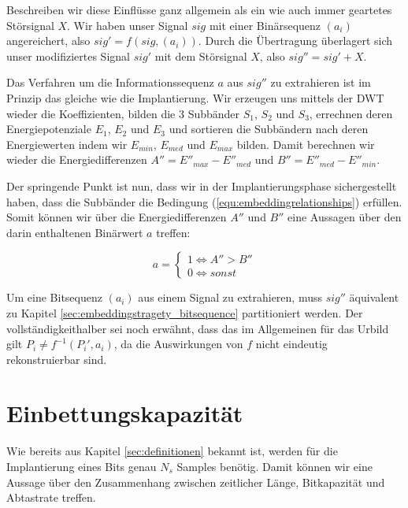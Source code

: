 Beschreiben wir diese Einflüsse ganz allgemein als ein wie auch immer geartetes Störsignal $X$. Wir haben unser Signal $sig$ mit einer Binärsequenz $({a}_{i})$ angereichert, also $sig' = f( sig, ({a}_{i}))$. Durch die Übertragung überlagert sich unser modifiziertes Signal $sig'$ mit dem Störsignal $X$, also $sig'' = sig' + X$.

Das Verfahren um die Informationssequenz $a$ aus $sig''$ zu extrahieren ist im Prinzip das gleiche wie die Implantierung. Wir erzeugen uns mittels der DWT wieder die Koeffizienten, bilden die 3 Subbänder ${S}_{1}$, ${S}_{2}$ und ${S}_{3}$, errechnen deren Energiepotenziale ${E}_{1}$, ${E}_{2}$ und ${E}_{3}$ und sortieren die Subbändern nach deren Energiewerten indem wir ${E}_{min}$, ${E}_{med}$ und ${E}_{max}$ bilden. Damit berechnen wir wieder die Energiedifferenzen $A'' = {E''}_{max} - {E''}_{med}$ und $B'' = {E''}_{med} - {E''}_{min}$.

Der springende Punkt ist nun, dass wir in der Implantierungsphase sichergestellt haben, dass die Subbänder die Bedingung (\ref{equ:embeddingrelationships}) erfüllen. Somit können wir über die Energiedifferenzen $A''$ und $B''$ eine Aussagen über den darin enthaltenen Binärwert $a$ treffen:

	 \begin{equation}
		 a = \begin{cases}
    	 	1 \iff A'' > B''	 
			\\
    		0 \iff sonst
  		 \end{cases}
	 	\label{equ:extraction_bedingungen}
	 \end{equation}
	 
Um eine Bitsequenz $({a}_{i})$ aus einem Signal zu extrahieren, muss $sig''$ äquivalent zu Kapitel \ref{sec:embeddingstragety_bitsequence} partitioniert werden. Der vollständigkeithalber sei noch erwähnt, dass das im Allgemeinen für das Urbild gilt ${P}_{i} \neq f^{-1}({P}_{i}', {a}_{i})$, da die Auswirkungen von $f$ nicht eindeutig rekonstruierbar sind. 

\section{Einbettungskapazit\"at}

Wie bereits aus Kapitel \ref{sec:definitionen} bekannt ist, werden für die Implantierung eines Bits genau $N_s$ Samples benötig. Damit können wir eine Aussage über den Zusammenhang zwischen zeitlicher Länge, Bitkapazität und Abtastrate treffen. 

